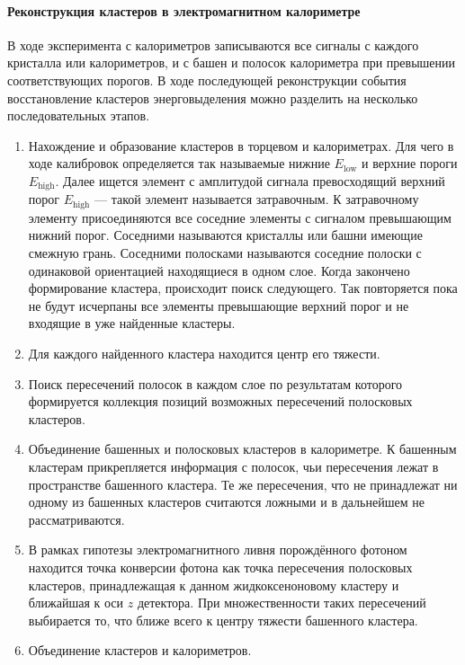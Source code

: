 \paragraph{Реконструкция кластеров в электромагнитном калориметре}


В ходе эксперимента с калориметров записываются все сигналы с каждого кристалла  или  калориметров,
и с башен и полосок  калориметра при превышении соответствующих порогов.
В ходе последующей реконструкции события восстановление кластеров энерговыделения можно разделить на несколько последовательных этапов.
\begin{enumerate}
    \item \label{itm:cluster_reco_1} Нахождение и образование кластеров в торцевом и  калориметрах.
    Для чего в ходе калибровок определяется так называемые нижние $E_{\text{low}}$ и верхние пороги $E_{\text{high}}$.
    Далее ищется элемент с амплитудой сигнала превосходящий верхний порог $E_{\text{high}}$
    --- такой элемент называется затравочным.
    К затравочному элементу присоединяются все соседние элементы с сигналом превышающим нижний порог.
    Соседними называются кристаллы или башни имеющие смежную грань.
    Соседними полосками называются соседние полоски с одинаковой ориентацией находящиеся в одном слое.
    Когда закончено формирование кластера,
    происходит поиск следующего.
    Так повторяется пока не будут исчерпаны все элементы превышающие верхний порог и не входящие в уже найденные кластеры.
    \item Для каждого найденного кластера находится центр его тяжести.
    \item Поиск пересечений полосок в каждом слое по результатам которого формируется коллекция позиций возможных пересечений полосковых кластеров.
    \item Объединение башенных и полосковых кластеров в  калориметре.
    К башенным кластерам прикрепляется информация с полосок,
    чьи пересечения лежат в пространстве башенного кластера.
    Те же пересечения,
    что не принадлежат ни одному из башенных кластеров считаются ложными и в дальнейшем не рассматриваются.
    \item В рамках гипотезы электромагнитного ливня порождённого фотоном находится точка конверсии фотона как точка пересечения полосковых кластеров,
    принадлежащая к данном жидкоксеноновому кластеру и ближайшая к оси $z$ детектора.
    При множественности таких пересечений выбирается то,
    что ближе всего к центру тяжести башенного кластера.
    \item Объединение кластеров  и  калориметров.

\end{enumerate}
